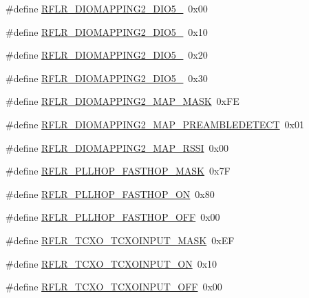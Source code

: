 \begin{DoxyCompactItemize}
\item 
\#define \hyperlink{sx1276Regs-LoRa_8h_a0e5493d208e6868affd080d05a7d467e}{R\+F\+L\+R\+\_\+\+D\+I\+O\+M\+A\+P\+P\+I\+N\+G2\+\_\+\+D\+I\+O5\+\_}~0x00
\item 
\#define \hyperlink{sx1276Regs-LoRa_8h_aba65bbca70d5269aa6579f9511d3e7ff}{R\+F\+L\+R\+\_\+\+D\+I\+O\+M\+A\+P\+P\+I\+N\+G2\+\_\+\+D\+I\+O5\+\_}~0x10
\item 
\#define \hyperlink{sx1276Regs-LoRa_8h_a2ad3aaa57ff9cc5032a3dfa5459ee087}{R\+F\+L\+R\+\_\+\+D\+I\+O\+M\+A\+P\+P\+I\+N\+G2\+\_\+\+D\+I\+O5\+\_}~0x20
\item 
\#define \hyperlink{sx1276Regs-LoRa_8h_a293990dac05ba899104544d255d9e1f3}{R\+F\+L\+R\+\_\+\+D\+I\+O\+M\+A\+P\+P\+I\+N\+G2\+\_\+\+D\+I\+O5\+\_}~0x30
\item 
\#define \hyperlink{sx1276Regs-LoRa_8h_a4a8cafb2b79d52ca4f11f47fef8b9884}{R\+F\+L\+R\+\_\+\+D\+I\+O\+M\+A\+P\+P\+I\+N\+G2\+\_\+\+M\+A\+P\+\_\+\+M\+A\+SK}~0x\+FE
\item 
\#define \hyperlink{sx1276Regs-LoRa_8h_a3f69971419d7493c492a601189ba9831}{R\+F\+L\+R\+\_\+\+D\+I\+O\+M\+A\+P\+P\+I\+N\+G2\+\_\+\+M\+A\+P\+\_\+\+P\+R\+E\+A\+M\+B\+L\+E\+D\+E\+T\+E\+CT}~0x01
\item 
\#define \hyperlink{sx1276Regs-LoRa_8h_a20f17873979d88df5568f438d530d5ec}{R\+F\+L\+R\+\_\+\+D\+I\+O\+M\+A\+P\+P\+I\+N\+G2\+\_\+\+M\+A\+P\+\_\+\+R\+S\+SI}~0x00
\item 
\#define \hyperlink{sx1276Regs-LoRa_8h_ac5ab476a5c458941851fdd45d4dd863c}{R\+F\+L\+R\+\_\+\+P\+L\+L\+H\+O\+P\+\_\+\+F\+A\+S\+T\+H\+O\+P\+\_\+\+M\+A\+SK}~0x7F
\item 
\#define \hyperlink{sx1276Regs-LoRa_8h_abeb38c8feecc22921c7099f076dd6996}{R\+F\+L\+R\+\_\+\+P\+L\+L\+H\+O\+P\+\_\+\+F\+A\+S\+T\+H\+O\+P\+\_\+\+ON}~0x80
\item 
\#define \hyperlink{sx1276Regs-LoRa_8h_ac5a89ff2be0dcb49df1188731bfb6503}{R\+F\+L\+R\+\_\+\+P\+L\+L\+H\+O\+P\+\_\+\+F\+A\+S\+T\+H\+O\+P\+\_\+\+O\+FF}~0x00
\item 
\#define \hyperlink{sx1276Regs-LoRa_8h_a2c9b68a7cd24f958fce90a5e5fa48e3f}{R\+F\+L\+R\+\_\+\+T\+C\+X\+O\+\_\+\+T\+C\+X\+O\+I\+N\+P\+U\+T\+\_\+\+M\+A\+SK}~0x\+EF
\item 
\#define \hyperlink{sx1276Regs-LoRa_8h_a4af451aaa27188e884108961c0e24bbb}{R\+F\+L\+R\+\_\+\+T\+C\+X\+O\+\_\+\+T\+C\+X\+O\+I\+N\+P\+U\+T\+\_\+\+ON}~0x10
\item 
\#define \hyperlink{sx1276Regs-LoRa_8h_a248c5dfb7c8e38ef7005ba6fdcfe94ca}{R\+F\+L\+R\+\_\+\+T\+C\+X\+O\+\_\+\+T\+C\+X\+O\+I\+N\+P\+U\+T\+\_\+\+O\+FF}~0x00

\end{DoxyCompactItemize}
